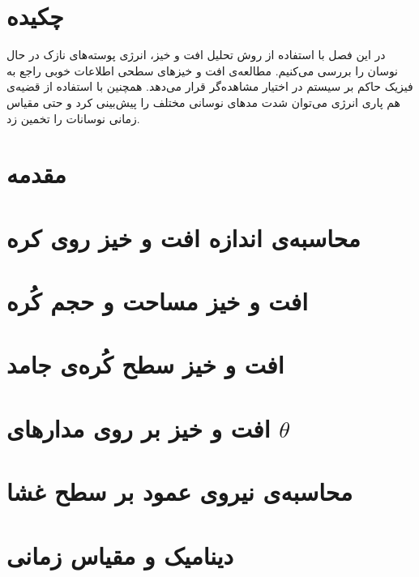 \setRL
\clearpage
\def \MemFluc {\Mempath /MembraneFluc}

\section{
چکیده
}
در این فصل با استفاده از روش تحلیل افت و خیز، انرژی پوسته‌های نازک در حال نوسان را بررسی می‌کنیم. مطالعه‌ی افت و خیز‌های سطحی اطلاعات خوبی راجع به فیزیک حاکم بر سیستم در اختیار مشاهده‌گر قرار می‌دهد. همچنین با استفاده از قضیه‌ی هم پاری انرژی می‌توان شدت‌ مد‌های نوسانی مختلف را پیش‌بینی کرد و حتی مقیاس زمانی نوسانات را تخمین زد.

\section{
مقدمه
}



\section{
محاسبه‌ی اندازه افت و خیز روی کره
\label{sec:bendingFluctuations}
}


\section{
افت و خیز مساحت و حجم کُره
}


\section{
افت و خیز سطح کُره‌ی جامد
}


\section{
افت و خیز بر روی مدارهای
$\theta$
}


\section{
محاسبه‌ی نیروی عمود بر سطح غشا
\label{sec:NormalForceDerivation}}


\section{\label{sec:TimeStep}
دینامیک و مقیاس زمانی
}







